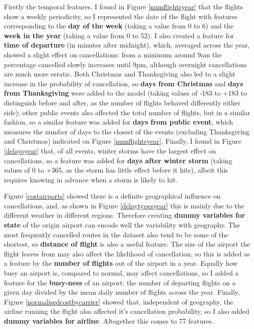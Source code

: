 \documentclass[a4paper]{article}
\begin{document}
Firstly the temporal features. I found in Figure \ref{numflightsyear} that the flights show a weekly periodicity, so I represented the date of the flight with features corresponding to the {\bf day of the week} (taking a value from 0 to 6) and the {\bf week in the year} (taking a value from 0 to 52). I also created a feature for {\bf time of departure} (in minutes after midnight), which, averaged across the year, showed a slight effect on cancellations: from a minimum around 9am the percentage cancelled slowly increases until 9pm, although overnight cancellations are much more erratic. Both Christmas and Thanksgiving also led to a slight increase in the probability of cancellation, so {\bf days from Christmas} and {\bf days from Thanksgiving} were added to the model (taking values of -183 to +183 to distinguish before and after, as the number of flights behaved differently either side); other public events also affected the total number of flights, but in a similar fashion, so a similar feature was added for {\bf days from public event}, which measures the number of days to the closest of the events (excluding Thanksgiving and Christmas) indicated on Figure \ref{numflightsyear}. Finally, I found in Figure \ref{delaysyear} that, of all events, winter storms have the largest effect on cancellations, so a feature was added for {\bf days after winter storm} (taking values of 0 to +365, as the storm has little effect before it hits), albeit this requires knowing in advance when a storm is likely to hit.

Figure \ref{costairports} showed there is a definite geographical influence on cancellations, and, as shown in Figure \ref{delaytypesyear}  this is mainly due to the different weather in different regions. Therefore creating {\bf dummy variables for state} of the origin airport can encode well the variability with geography. The most frequently cancelled routes in the dataset also tend to be some of the shortest, so {\bf distance of flight} is also a useful feature. The size of the airport the flight leaves from may also affect the likelihood of cancellation, so this is added as a feature by the {\bf number of flights} out of the airport in a year. Equally how busy an airport is, compared to normal, may affect cancellations, so I added a feature for the {\bf busy-ness} of an airport: the number of departing flights on a given day divided by the mean daily number of flights across the year. Finally, Figure \ref{normalisedcostbycarrier} showed that, independent of geography, the airline running the flight also affected it's cancellation probability, so I also added {\bf dummy variables for airline}. Altogether this comes to 77 features.
\end{document}

